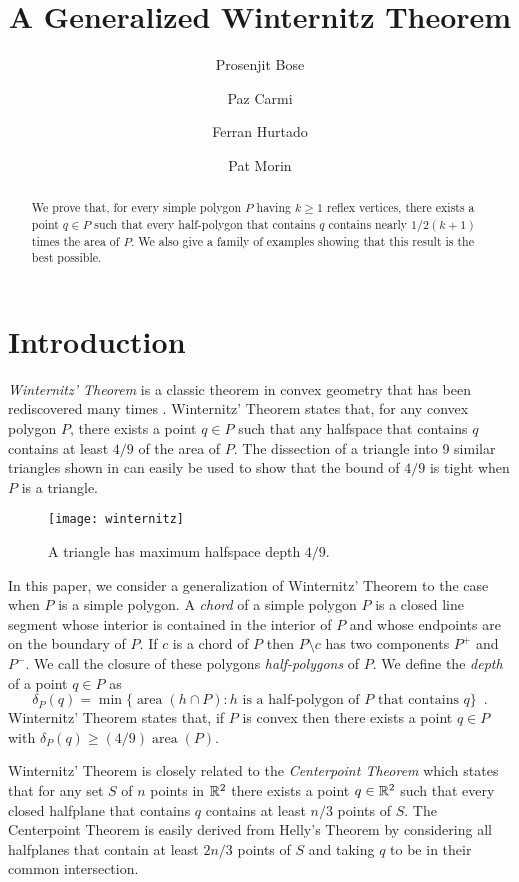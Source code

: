 \documentclass{article}
\title{A Generalized Winternitz Theorem}
\author{Prosenjit Bose \and 
	Paz Carmi \and
	Ferran Hurtado \and
	Pat Morin}
\DeclareMathOperator{\area}{area}
\begin{document}
\maketitle
\begin{abstract}
We prove that, for every simple polygon $P$ having $k\ge 1$ reflex
vertices, there exists a point $q\in P$ such that every half-polygon
that contains $q$ contains nearly $1/2(k+1)$ times the area of $P$.
We also give a family of examples showing that this result is the best
possible.
\end{abstract}

\section{Introduction}

\emph{Winternitz' Theorem} \cite[pp.~54--55]{b23} is a classic theorem
in convex geometry that has been rediscovered many times
\cite{e55b,ll35,n45,n58,yb51}.  Winternitz' Theorem states that, for
any convex polygon $P$, there exists a point $q\in P$ such that any
halfspace that contains $q$ contains at least $4/9$ of the area of
$P$.  The dissection of a triangle into 9 similar triangles shown in
 can easily be used to show that the bound of $4/9$
is tight when $P$ is a triangle.

\begin{figure}
  \begin{center}
    \texttt{[image: winternitz]}
  \end{center}
  \caption{A triangle has maximum halfspace depth $4/9$.}
\end{figure}


In this paper, we consider a generalization of Winternitz' Theorem to
the case when $P$ is a simple polygon.  A \emph{chord} of a simple
polygon $P$ is a closed line segment whose interior is contained in
the interior of $P$ and whose endpoints are on the boundary of $P$.
If $c$ is a chord of $P$ then $P\setminus c$ has two components $P^+$
and $P^-$.  We call the closure of these polygons \emph{half-polygons}
of $P$.  We define the \emph{depth} of a point $q\in P$ as 
\[
     \delta_P(q) = \min\{\area(h\cap P) : \mbox{$h$ is a half-polygon
	of $P$ that contains $q$} \} \enspace .
\]
Winternitz' Theorem states that, if $P$ is convex then there exists a
point $q\in P$ with $\delta_P(q)\ge (4/9)\area(P)$.  

Winternitz' Theorem is closely related to the \emph{Centerpoint
Theorem} \cite{pa95,m02} which states that for any set $S$ of $n$
points in $\mathbb{R}^2$ there exists a point $q\in\mathbb{R}^2$ such that every
closed halfplane that contains $q$ contains at least $n/3$
points of $S$.  The Centerpoint Theorem is easily derived from Helly's
Theorem \cite{e93} by considering all halfplanes that contain at least
$2n/3$ points of $S$ and taking $q$ to be in their common
intersection.
\end{document}
